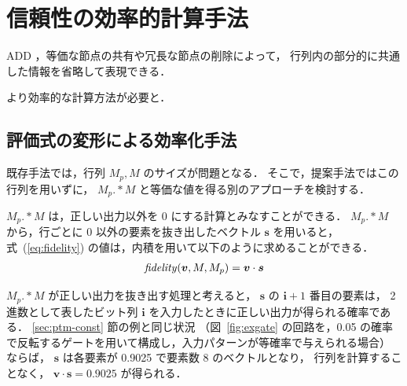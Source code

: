 \chapter{信頼性の効率的計算手法}\label{sec:proposed}

ADD ，等価な節点の共有や冗長な節点の削除によって，
行列内の部分的に共通した情報を省略して表現できる．

より効率的な計算方法が必要と．

\section{評価式の変形による効率化手法}\label{sec:prop:deform}

既存手法では，行列 $M_p, M$ のサイズが問題となる．
そこで，提案手法ではこの行列を用いずに， $M_p .* M$ と等価な値を得る別のアプローチを検討する．

$M_p .* M$ は，正しい出力以外を 0 にする計算とみなすことができる．
$M_p .* M$ から，行ごとに 0 以外の要素を抜き出したベクトル ${\bm s}$ を用いると，
式~(\ref{eq:fidelity}) の値は，内積を用いて以下のように求めることができる．
\begin{eqnarray}
  {\it fidelity}({\bm v}, M, M_p) = {\bm v} \cdot {\bm s} \label{eq:deformed}
\end{eqnarray}

$M_p .* M$ が正しい出力を抜き出す処理と考えると， ${\bm s}$ の $\bm{i} + 1$ 番目の要素は，
2 進数として表したビット列 ${\bm i}$ を入力したときに正しい出力が得られる確率である．
\ref{sec:ptm-const} 節の例と同じ状況
（図~\ref{fig:exgate} の回路を，0.05 の確率で反転するゲートを用いて構成し，入力パターンが等確率で与えられる場合）
ならば， ${\bm s}$ は各要素が 0.9025 で要素数 8 のベクトルとなり，
行列を計算することなく， ${\bm v} \cdot {\bm s} = 0.9025$ が得られる．

